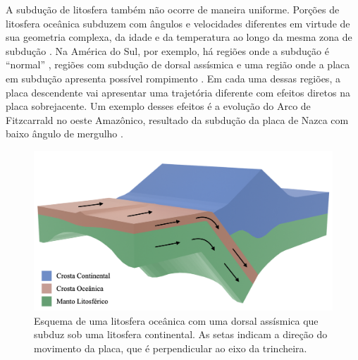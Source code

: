 A subdução de litosfera também não ocorre de maneira uniforme. Porções de litosfera oceânica subduzem com ângulos e velocidades diferentes em virtude de sua geometria complexa, da idade e da temperatura ao longo da mesma zona de subdução \citep{barazangi1976spatial,cahill1992seismicity,muller2008age}. Na América do Sul, por exemplo, há regiões onde a subdução é ``normal'' \citep{barazangi1976spatial,cahill1992seismicity}, regiões com subdução de dorsal assísmica \citep{espurt2007nazca,manea2012chilean,gutscher1999tectonic,alvarado2009flat} e uma região onde a placa em subdução apresenta possível rompimento \citep{barazangi1976spatial}. Em cada uma dessas regiões, a placa descendente vai apresentar uma trajetória diferente com efeitos diretos na placa sobrejacente. Um exemplo desses efeitos é a evolução do Arco de Fitzcarrald no oeste Amazônico, resultado da subdução da placa de Nazca com baixo ângulo de mergulho \citep{espurt2007nazca}.


\begin{figure}[htb]
  \begin{center}
    \includegraphics[width=0.9 \columnwidth]{fig/ridge-subduction.png}
  	\caption{\label{ridge-subduction}Esquema de uma litosfera oceânica com uma dorsal assísmica que subduz sob uma litosfera continental. As setas indicam a direção do movimento da placa, que é perpendicular ao eixo da trincheira.}
  \end{center}
\end{figure}

